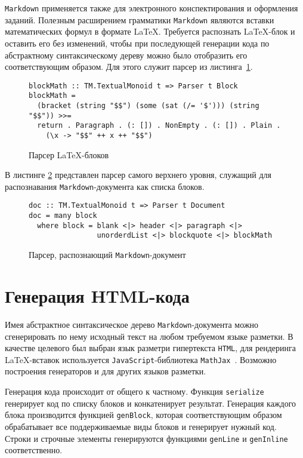 \lstinline{Markdown} применяется также для электронного конспектирования и
оформления заданий. Полезным расширением грамматики \lstinline{Markdown}
являются вставки математических формул в формате \LaTeX. Требуется распознать
\LaTeX-блок и оставить его без изменений, чтобы при последующей генерации кода
по абстрактному синтаксическому дереву можно было отобразить его соответствующим
образом. Для этого служит парсер из листинга~\ref{listing:MarkdownLaTeX}.

\begin{figure}[h]
\begin{lstlisting}
blockMath :: TM.TextualMonoid t => Parser t Block
blockMath =
  (bracket (string "$$") (some (sat (/= '$'))) (string "$$")) >>=
  return . Paragraph . (: []) . NonEmpty . (: []) . Plain .
    (\x -> "$$" ++ x ++ "$$")
\end{lstlisting}
\caption{Парсер \LaTeX-блоков}
\label{listing:MarkdownLaTeX}
\end{figure}

В листинге \ref{listing:MarkdownDoc} представлен парсер самого верхнего уровня,
служащий для распознавания \lstinline{Markdown}-документа как списка блоков.

\begin{figure}[h]
\begin{lstlisting}
doc :: TM.TextualMonoid t => Parser t Document
doc = many block
  where block = blank <|> header <|> paragraph <|>
                unorderdList <|> blockquote <|> blockMath
\end{lstlisting}
\caption{Парсер, распознающий \lstinline{Markdown}-документ}
\label{listing:MarkdownDoc}
\end{figure}

\section{Генерация HTML-кода}

Имея абстрактное синтаксическое дерево \lstinline{Markdown}-документа можно
сгенерировать по нему исходный текст на любом требуемом языке разметки.
В качестве целевого был выбран язык разметри гипертекста \lstinline{HTML}, для рендеринга
\LaTeX-вставок используется \lstinline{JavaScript}-библиотека
\lstinline{MathJax}~\cite{mathJax}. Возможно построения генераторов и для
других языков разметки.

Генерация кода происходит от общего к частному. Функция \lstinline{serialize}
генерирует код по списку блоков и конкатенирует результат. Генерация каждого
блока производится функцией \lstinline{genBlock}, которая соответствующим
образом обрабатывает все поддерживаемые виды блоков и генерирует нужный код.
Строки и строчные элементы генерируются функциями \lstinline{genLine} и
\lstinline{genInline} соответственно.

